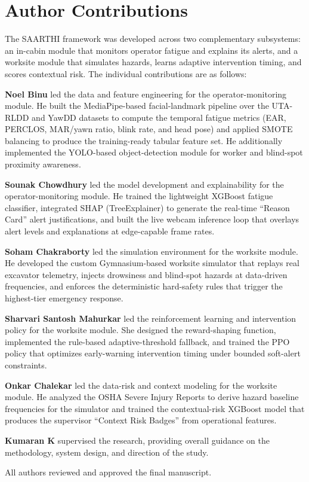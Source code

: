 \section*{Author Contributions}

The SAARTHI framework was developed across two complementary subsystems: an in-cabin module that monitors operator fatigue and explains its alerts, and a worksite module that simulates hazards, learns adaptive intervention timing, and scores contextual risk. The individual contributions are as follows:

\textbf{Noel Binu} led the data and feature engineering for the operator-monitoring module. He built the MediaPipe-based facial-landmark pipeline over the UTA-RLDD and YawDD datasets to compute the temporal fatigue metrics (EAR, PERCLOS, MAR/yawn ratio, blink rate, and head pose) and applied SMOTE balancing to produce the training-ready tabular feature set. He additionally implemented the YOLO-based object-detection module for worker and blind-spot proximity awareness.

\textbf{Sounak Chowdhury} led the model development and explainability for the operator-monitoring module. He trained the lightweight XGBoost fatigue classifier, integrated SHAP (TreeExplainer) to generate the real-time ``Reason Card'' alert justifications, and built the live webcam inference loop that overlays alert levels and explanations at edge-capable frame rates.

\textbf{Soham Chakraborty} led the simulation environment for the worksite module. He developed the custom Gymnasium-based worksite simulator that replays real excavator telemetry, injects drowsiness and blind-spot hazards at data-driven frequencies, and enforces the deterministic hard-safety rules that trigger the highest-tier emergency response.

\textbf{Sharvari Santosh Mahurkar} led the reinforcement learning and intervention policy for the worksite module. She designed the reward-shaping function, implemented the rule-based adaptive-threshold fallback, and trained the PPO policy that optimizes early-warning intervention timing under bounded soft-alert constraints.

\textbf{Onkar Chalekar} led the data-risk and context modeling for the worksite module. He analyzed the OSHA Severe Injury Reports to derive hazard baseline frequencies for the simulator and trained the contextual-risk XGBoost model that produces the supervisor ``Context Risk Badges'' from operational features.

\textbf{Kumaran K} supervised the research, providing overall guidance on the methodology, system design, and direction of the study.

All authors reviewed and approved the final manuscript.
